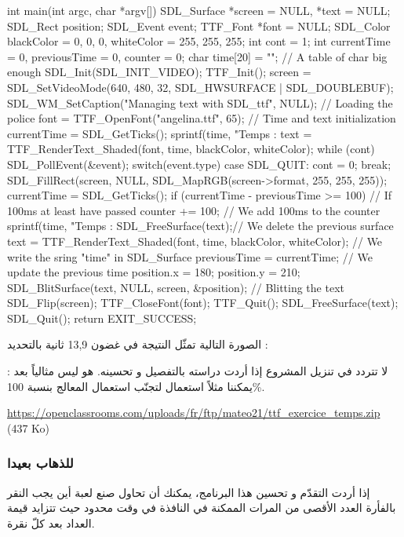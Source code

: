 \begin{Csource}
int main(int argc, char *argv[])
{
	SDL_Surface *screen = NULL, *text = NULL;
	SDL_Rect position;
	SDL_Event event;
	TTF_Font *font = NULL;
	SDL_Color blackColor = {0, 0, 0}, whiteColor = {255, 255, 255};
	int cont = 1;
	int currentTime = 0, previousTime = 0, counter = 0;
	char time[20] = ""; // A table of char big enough
	SDL_Init(SDL_INIT_VIDEO);
	TTF_Init();
	screen = SDL_SetVideoMode(640, 480, 32, SDL_HWSURFACE | SDL_DOUBLEBUF);
	SDL_WM_SetCaption("Managing text with SDL_ttf", NULL);
	// Loading the police
	font = TTF_OpenFont("angelina.ttf", 65);
	// Time and text initialization
	currentTime = SDL_GetTicks();
	sprintf(time, "Temps : %
	text = TTF_RenderText_Shaded(font, time, blackColor, whiteColor);
	while (cont)
	{
		SDL_PollEvent(&event);
		switch(event.type)
		{
			case SDL_QUIT:
			cont = 0;
			break;
		}
		SDL_FillRect(screen, NULL, SDL_MapRGB(screen->format, 255, 255, 255));
		currentTime = SDL_GetTicks();
		if (currentTime - previousTime >= 100) // If 100ms at least have passed
		{
			counter += 100; // We add 100ms to the counter
			sprintf(time, "Temps : %
			SDL_FreeSurface(text);// We delete the previous surface
			text = TTF_RenderText_Shaded(font, time, blackColor, whiteColor); // We write the sring "time" in SDL_Surface
			previousTime = currentTime; // We update the previous time
		}
		position.x = 180;
		position.y = 210;
		SDL_BlitSurface(text, NULL, screen, &position); // Blitting the text
		SDL_Flip(screen);
	}
	TTF_CloseFont(font);
	TTF_Quit();
	SDL_FreeSurface(text);
	SDL_Quit();
	return EXIT_SUCCESS;
}
\end{Csource}
 
الصورة التالية تمثّل النتيجة في غضون 13,9 ثانية بالتحديد :


لا تتردد في تنزيل المشروع إذا أردت دراسته بالتفصيل و تحسينه. هو ليس مثالياً بعد : يمكننا مثلاً استعمال
لتجنّب استعمال المعالج بنسبة 100\%.

\textenglish{\url{https://openclassrooms.com/uploads/fr/ftp/mateo21/ttf_exercice_temps.zip} (437 Ko)}

\subsubsection{للذهاب بعيدا}

إذا أردت التقدّم و تحسين هذا البرنامج، يمكنك أن تحاول صنع لعبة أين يجب النقر بالفأرة العدد الأقصى من المرات الممكنة في النافذة في وقت محدود حيث تتزايد قيمة العداد بعد كلّ نقرة.

